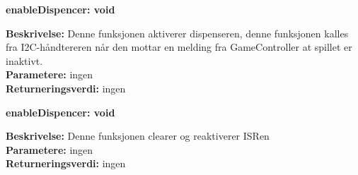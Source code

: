\documentclass[Arkitektur/System_main.tex]{subfiles}
\begin{document}
\textbf {enableDispencer: void}
\begin{adjustwidth}{1cm}{0pt}
\textbf {Beskrivelse:} Denne funksjonen aktiverer dispenseren, denne funksjonen kalles fra I2C-håndtereren når den mottar en melding fra GameController at spillet er inaktivt. \\ [0.2cm]
\textbf {Parametere:} ingen \\ [0.2cm]
\textbf {Returneringsverdi:} ingen \\ [0.2cm]
\end{adjustwidth}


\textbf {enableDispencer: void}
\begin{adjustwidth}{1cm}{0pt}
\textbf {Beskrivelse:} Denne funksjonen clearer og reaktiverer ISRen \\ [0.2cm]
\textbf {Parametere:} ingen \\ [0.2cm]
\textbf {Returneringsverdi:} ingen \\ [0.2cm]
\end{adjustwidth}
\end{document}
